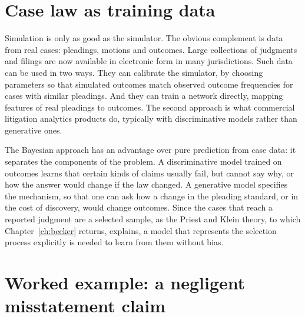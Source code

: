 \section{Case law as training data}

Simulation is only as good as the simulator. The obvious complement is data from real cases: pleadings, motions and outcomes. Large collections of judgments and filings are now available in electronic form in many jurisdictions. Such data can be used in two ways. They can calibrate the simulator, by choosing parameters so that simulated outcomes match observed outcome frequencies for cases with similar pleadings. And they can train a network directly, mapping features of real pleadings to outcomes. The second approach is what commercial litigation analytics products do, typically with discriminative models rather than generative ones.

The Bayesian approach has an advantage over pure prediction from case data: it separates the components of the problem. A discriminative model trained on outcomes learns that certain kinds of claims usually fail, but cannot say why, or how the answer would change if the law changed. A generative model specifies the mechanism, so that one can ask how a change in the pleading standard, or in the cost of discovery, would change outcomes. Since the cases that reach a reported judgment are a selected sample, as the Priest and Klein theory, to which Chapter~\ref{ch:becker} returns, explains, a model that represents the selection process explicitly is needed to learn from them without bias.

\section{Worked example: a negligent misstatement claim}

